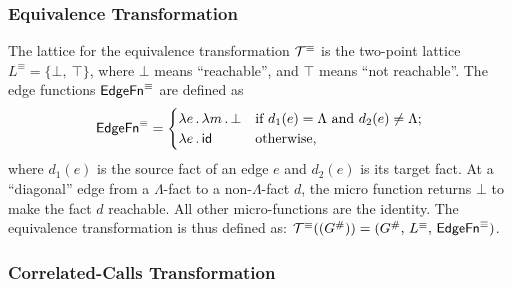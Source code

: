 
\subsubsection{Equivalence Transformation}\label{sec:equivtrans}

The lattice
for the equivalence transformation $\mathcal T^\equiv$ 
is the two-point lattice
    $L^\equiv=\{\bot,\ \top\}$,
where $\bot$ means ``reachable'', and $\top$ means ``not reachable''. 
The edge functions $\textsf{EdgeFn}^\equiv$ are defined as
\begin{equation}
    \textsf{EdgeFn}^\equiv=
    \begin{cases}
      \lambda e\,.\,\lambda m\,.\,\bot&\text{if $d_1(e)=\Lambda$ and $d_2(e)\ne\Lambda$;}\\
      \lambda e\,.\,\textsf{id}&\text{otherwise,}
    \end{cases}
\end{equation}
where $d_1(e)$ is the source fact of an edge $e$ and $d_2(e)$ is its target fact. 
At a ``diagonal'' edge from a $\Lambda$-fact to a non-$\Lambda$-fact
$d$, the micro function returns $\bot$
to make
the fact $d$ reachable. All other micro-functions are the identity.
The equivalence transformation is thus defined as:
  $\mathcal T^\equiv((G^\#))=(G^\#,\,L^\equiv,\,\mathsf{EdgeFn}^\equiv)$.


\subsubsection{Correlated-Calls Transformation}\label{sec:cctrans}

